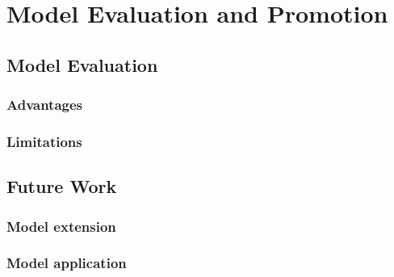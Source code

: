 \section{Model Evaluation and Promotion}
\subsection{Model Evaluation}

\subsubsection{Advantages}





\subsubsection{Limitations}



\subsection{Future Work}

\subsubsection{Model extension}


\subsubsection{Model application}

